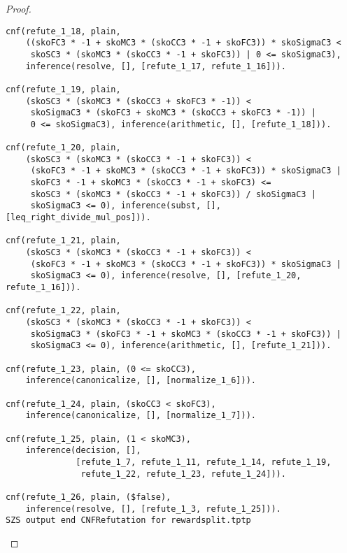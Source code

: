 \begin{proof}
\begin{verbatim}
cnf(refute_1_18, plain,
    ((skoFC3 * -1 + skoMC3 * (skoCC3 * -1 + skoFC3)) * skoSigmaC3 <
     skoSC3 * (skoMC3 * (skoCC3 * -1 + skoFC3)) | 0 <= skoSigmaC3),
    inference(resolve, [], [refute_1_17, refute_1_16])).

cnf(refute_1_19, plain,
    (skoSC3 * (skoMC3 * (skoCC3 + skoFC3 * -1)) <
     skoSigmaC3 * (skoFC3 + skoMC3 * (skoCC3 + skoFC3 * -1)) |
     0 <= skoSigmaC3), inference(arithmetic, [], [refute_1_18])).

cnf(refute_1_20, plain,
    (skoSC3 * (skoMC3 * (skoCC3 * -1 + skoFC3)) <
     (skoFC3 * -1 + skoMC3 * (skoCC3 * -1 + skoFC3)) * skoSigmaC3 |
     skoFC3 * -1 + skoMC3 * (skoCC3 * -1 + skoFC3) <=
     skoSC3 * (skoMC3 * (skoCC3 * -1 + skoFC3)) / skoSigmaC3 |
     skoSigmaC3 <= 0), inference(subst, [], [leq_right_divide_mul_pos])).

cnf(refute_1_21, plain,
    (skoSC3 * (skoMC3 * (skoCC3 * -1 + skoFC3)) <
     (skoFC3 * -1 + skoMC3 * (skoCC3 * -1 + skoFC3)) * skoSigmaC3 |
     skoSigmaC3 <= 0), inference(resolve, [], [refute_1_20, refute_1_16])).

cnf(refute_1_22, plain,
    (skoSC3 * (skoMC3 * (skoCC3 * -1 + skoFC3)) <
     skoSigmaC3 * (skoFC3 * -1 + skoMC3 * (skoCC3 * -1 + skoFC3)) |
     skoSigmaC3 <= 0), inference(arithmetic, [], [refute_1_21])).

cnf(refute_1_23, plain, (0 <= skoCC3),
    inference(canonicalize, [], [normalize_1_6])).

cnf(refute_1_24, plain, (skoCC3 < skoFC3),
    inference(canonicalize, [], [normalize_1_7])).

cnf(refute_1_25, plain, (1 < skoMC3),
    inference(decision, [],
              [refute_1_7, refute_1_11, refute_1_14, refute_1_19,
               refute_1_22, refute_1_23, refute_1_24])).

cnf(refute_1_26, plain, ($false),
    inference(resolve, [], [refute_1_3, refute_1_25])).
SZS output end CNFRefutation for rewardsplit.tptp
\end{verbatim}
  \fi
\end{proof}

